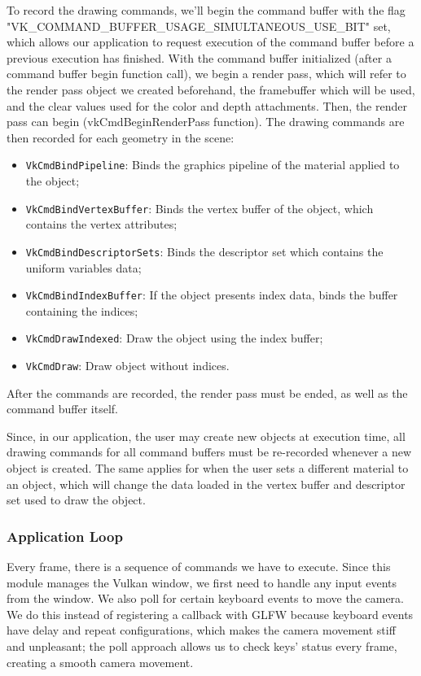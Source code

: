 To record the drawing commands, we'll begin the command buffer with the flag "VK\_COMMAND\_BUFFER\_USAGE\_SIMULTANEOUS\_USE\_BIT" set, which allows our application to request execution of the command buffer before a previous execution has finished. With the command buffer initialized (after a command buffer begin function call), we begin a render pass, which will refer to the render pass object we created beforehand, the framebuffer which will be used, and the clear values used for the color and depth attachments. Then, the render pass can begin (vkCmdBeginRenderPass function). The drawing commands are then recorded for each geometry in the scene:

\begin{itemize}
    \item \texttt{VkCmdBindPipeline}: Binds the graphics pipeline of the material applied to the object;
    \item \texttt{VkCmdBindVertexBuffer}: Binds the vertex buffer of the object, which contains the vertex attributes;
    \item \texttt{VkCmdBindDescriptorSets}: Binds the descriptor set which contains the uniform variables data;
    \item \texttt{VkCmdBindIndexBuffer}: If the object presents index data, binds the buffer containing the indices;
    \item \texttt{VkCmdDrawIndexed}: Draw the object using the index buffer;
    \item \texttt{VkCmdDraw}: Draw object without indices.
\end{itemize}

After the commands are recorded, the render pass must be ended, as well as the command buffer itself.

Since, in our application, the user may create new objects at execution time, all drawing commands for all command buffers must be re-recorded whenever a new object is created. The same applies for when the user sets a different material to an object, which will change the data loaded in the vertex buffer and descriptor set used to draw the object.

\subsubsection{Application Loop}
Every frame, there is a sequence of commands we have to execute. Since this module manages the Vulkan window, we first need to handle any input events from the window. We also poll for certain keyboard events to move the camera. We do this instead of registering a callback with GLFW because keyboard events have delay and repeat configurations, which makes the camera movement stiff and unpleasant; the poll approach allows us to check keys' status every frame, creating a smooth camera movement.

